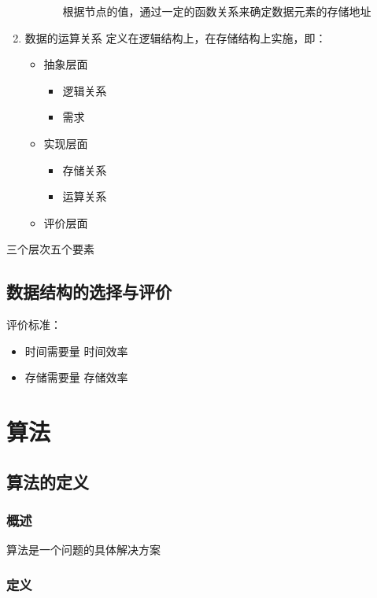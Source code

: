 \documentclass[AutoFakeBold]{LZUThesis2007}
\begin{document}
\begin{enumerate}
\begin{itemize}
\begin{itemize}
									根据节点的值，通过一定的函数关系来确定数据元素的存储地址

					\end{itemize}
			\end{itemize}
	\item 数据的运算关系
				定义在逻辑结构上，在存储结构上实施，即：
				\begin{itemize}
					\item  抽象层面
						\begin{itemize}
							\item 逻辑关系
							\item 需求
						\end{itemize}
					\item  实现层面
						\begin{itemize}
							\item 存储关系
							\item 运算关系
						\end{itemize}
					\item  评价层面
				\end{itemize}
\end{enumerate}

三个层次五个要素

	\section{数据结构的选择与评价}
		评价标准：
			\begin{itemize}
				\item 时间需要量 时间效率
				\item 存储需要量 存储效率
			\end{itemize}

\chapter{算法}
	\section{算法的定义}
		\subsection{概述}

			算法是一个问题的具体解决方案

		\subsection{定义}
\end{document}
